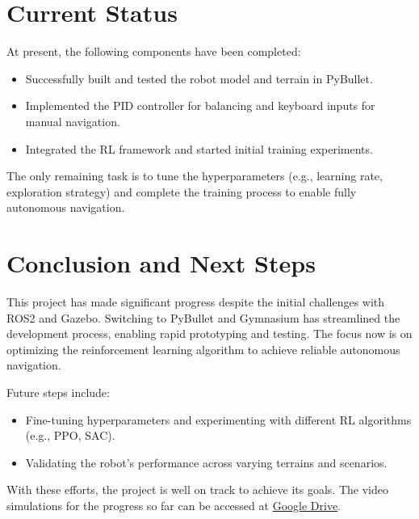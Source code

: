 \documentclass[12pt]{article}
\begin{document}
\section*{Current Status}
At present, the following components have been completed:
\begin{itemize}
    \item Successfully built and tested the robot model and terrain in PyBullet.
    \item Implemented the PID controller for balancing and keyboard inputs for manual navigation.
    \item Integrated the RL framework and started initial training experiments.
\end{itemize}
The only remaining task is to tune the hyperparameters (e.g., learning rate, exploration strategy) and complete the training process to enable fully autonomous navigation.

\section*{Conclusion and Next Steps}
This project has made significant progress despite the initial challenges with ROS2 and Gazebo. Switching to PyBullet and Gymnasium has streamlined the development process, enabling rapid prototyping and testing. The focus now is on optimizing the reinforcement learning algorithm to achieve reliable autonomous navigation.

Future steps include:
\begin{itemize}
    \item Fine-tuning hyperparameters and experimenting with different RL algorithms (e.g., PPO, SAC).
    \item Validating the robot's performance across varying terrains and scenarios.
\end{itemize}

With these efforts, the project is well on track to achieve its goals. The video simulations for the progress so far can be accessed at \href{https://drive.google.com/drive/folders/1VXDsfIzYMMSa4MjszimPH14E_rtIcNOd?usp=sharing}{Google Drive}.
\end{document}
